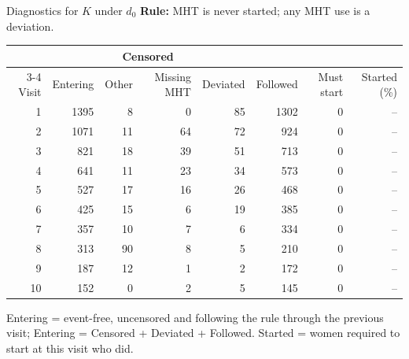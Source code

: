 \documentclass[11pt, xcolor={dvipsnames}, usepdftitle=false]{beamer}
\begin{document}
\begin{frame}{Diagnostics for $K$ under $d_0$}
\centering
{\small \textbf{Rule:} MHT is never started; any MHT use is a deviation.}\par\vspace{6pt}
{\scriptsize
\begin{tabular}{r r r r r r r r}
\toprule
 & & \multicolumn{2}{c}{Censored} & & & & \\
\cmidrule(lr){3-4}
Visit & Entering & Other & Missing MHT & Deviated & Followed & Must start & Started (\%) \\
\midrule
1 & 1395 & 8 & 0 & 85 & 1302 & 0 & -- \\
2 & 1071 & 11 & 64 & 72 & 924 & 0 & -- \\
3 & 821 & 18 & 39 & 51 & 713 & 0 & -- \\
4 & 641 & 11 & 23 & 34 & 573 & 0 & -- \\
5 & 527 & 17 & 16 & 26 & 468 & 0 & -- \\
6 & 425 & 15 & 6 & 19 & 385 & 0 & -- \\
7 & 357 & 10 & 7 & 6 & 334 & 0 & -- \\
8 & 313 & 90 & 8 & 5 & 210 & 0 & -- \\
9 & 187 & 12 & 1 & 2 & 172 & 0 & -- \\
10 & 152 & 0 & 2 & 5 & 145 & 0 & -- \\
\bottomrule
\end{tabular}}
\par\vspace{6pt}
{\tiny Entering = event-free, uncensored and following the rule through the previous visit; Entering = Censored + Deviated + Followed. Started = women required to start at this visit who did.}
\end{frame}
\end{document}
